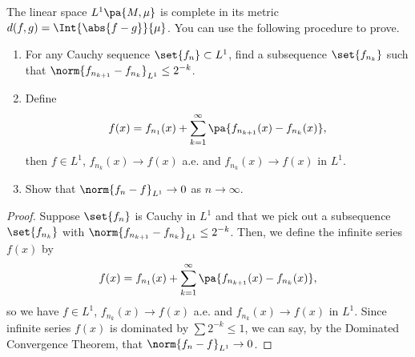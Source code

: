 \documentclass[10pt,letterpaper,twoside]{hmcpset}
\begin{document}
\begin{problem}[6]
 The linear space $L^1\pa{M, \mu}$ is complete in its metric $d(f,g) = \Int{\abs{f-g}}{\mu}$. You can use the following procedure to prove.
 
 \begin{enumerate}[label=(\alph*)]
  \item For any Cauchy sequence $\set{f_n} \subset L^1$, find a subsequence $\set{f_{n_k}}$ such that $\norm{f_{n_{k+1}} - f_{n_k}}_{L^1} \leq 2^{-k}$.
  \item Define \[f(x) = f_{n_1}(x) + \sum^\infty_{k=1}\pa{f_{n_{k+1}}(x) - f_{n_k}(x)},\] then $f \in L^1$, $f_{n_k}(x) \to f(x)$ a.e. and $f_{n_k}(x) \to f(x)$ in $L^1$.
  \item Show that $\norm{f_n - f}_{L^1} \to 0$ as $n\to\infty$.
 \end{enumerate}

\end{problem}

\begin{solution}
 \begin{proof}
  Suppose $\set{f_n}$ is Cauchy in $L^1$ and that we pick out a subsequence $\set{f_{n_k}}$ with $\norm{f_{n_{k+1}} - f_{n_k}}_{L^1} \leq 2^{-k}$.  Then, we define the infinite series $f(x)$ by \[f(x) = f_{n_1}(x) + \sum^\infty_{k=1}\pa{f_{n_{k+1}}(x) - f_{n_k}(x)},\] so we have $f \in L^1$, $f_{n_k}(x) \to f(x)$ a.e. and $f_{n_k}(x) \to f(x)$ in $L^1$.  Since infinite series $f(x)$ is dominated by $\sum 2^{-k} \leq 1$, we can say, by the Dominated Convergence Theorem, that $\norm{f_n - f}_{L^1} \to 0$.
 \end{proof}

\end{solution}
\end{document}
